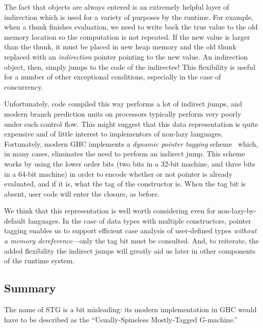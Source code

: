 

The fact that objects are always entered is an extremely helpful layer
of indirection which is used for a variety of purposes by the runtime.
For example, when a thunk finishes evaluation, we need to write back the
true value to the old memory location so the computation is not
repeated.  If the new value is larger than the thunk, it must be placed
in new heap memory and the old thunk replaced with an \emph{indirection}
pointer pointing to the new value.  An indirection object, then, simply
jumps to the code of the indirectee!  This flexibility is useful for a
number of other exceptional conditions, especially in the case of
concurrency.

Unfortunately, code compiled this way performs a lot of indirect jumps,
and modern branch prediction units on processors typically perform very
poorly under such control flow.  This might suggest that this data
representation is quite expensive and of little interest to implementors
of non-lazy languages.  Fortunately, modern GHC implements a
\emph{dynamic pointer tagging} scheme~\XXX{} which, in many cases,
eliminates the need to perform an indirect jump.  This scheme works by
using the lower order bits (two bits in a 32-bit machine, and three bits
in a 64-bit machine) in order to encode whether or not pointer is
already evaluated, and if it is, what the tag of the constructor is.
When the tag bit is absent, user code will enter the closure, as before.

We think that this representation is well worth considering even for
non-lazy-by-default languages.  In the case of data types with multiple
constructors, pointer tagging enables us to support efficient case
analysis of user-defined types \emph{without a memory
dereference}---only the tag bit must be consulted.  And, to reiterate,
the added flexibility the indirect jumps will greatly aid us later in
other components of the runtime system.


\subsection{Summary}


The name of STG is a bit misleading: its modern implementation in GHC
would have to be described as the ``Usually-Spineless Mostly-Tagged
G-machine.''
